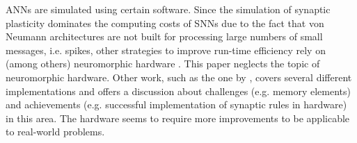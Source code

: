 \Acp{ANN} are simulated using certain software.
Since the simulation of synaptic plasticity dominates the computing costs of \acp{SNN} due to the fact that von Neumann architectures are not built 
for processing large numbers of small messages, i.e. spikes, 
other strategies to improve run-time efficiency rely on (among others) neuromorphic hardware \cite{simulation_STDP}.
This paper neglects the topic of neuromorphic hardware.
Other work, such as the one by \authorsSynapticPlasticity{} \cite{Synaptic_plasticity}, 
covers several different implementations and offers a discussion about challenges (e.g. memory elements) and achievements 
(e.g. successful implementation of synaptic rules in hardware) in this area.
The hardware seems to require more improvements to be applicable to real-world problems.